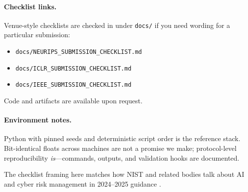 \paragraph{Checklist links.}
Venue-style checklists are checked in under \texttt{docs/} if you need wording for a particular submission:
\begin{itemize}
    \item \texttt{docs/NEURIPS\_SUBMISSION\_CHECKLIST.md}
    \item \texttt{docs/ICLR\_SUBMISSION\_CHECKLIST.md}
    \item \texttt{docs/IEEE\_SUBMISSION\_CHECKLIST.md}
\end{itemize}
Code and artifacts are available upon request.

\paragraph{Environment notes.}
Python with pinned seeds and deterministic script order is the reference stack. Bit-identical floats across machines are not a promise we make; protocol-level reproducibility \emph{is}---commands, outputs, and validation hooks are documented.

The checklist framing here matches how NIST and related bodies talk about AI and cyber risk management in 2024--2025 guidance \cite{nistairmf2023,nistcsf2024}.
